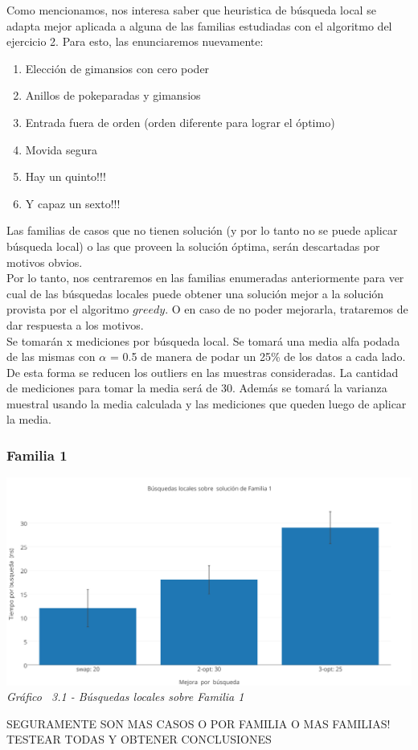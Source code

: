 Como mencionamos, nos interesa saber que heuristica de búsqueda local se adapta mejor aplicada a alguna de las familias estudiadas con el algoritmo del ejercicio 2. Para esto, las enunciaremos nuevamente:

\begin{enumerate}
\item Elección de gimansios con cero poder 
\item Anillos de pokeparadas y gimansios
\item Entrada fuera de orden (orden diferente para lograr el óptimo)
\item Movida segura
\item Hay un quinto!!!
\item Y capaz un sexto!!!
\end{enumerate}

Las familias de casos que no tienen solución (y por lo tanto no se puede aplicar búsqueda local) o las que proveen la solución óptima, serán descartadas por motivos obvios.\\
Por lo tanto, nos centraremos en las familias enumeradas anteriormente para ver cual de las búsquedas locales puede obtener una solución mejor a la solución provista por el algoritmo $greedy$. O en caso de no poder mejorarla, trataremos de dar respuesta a los motivos.\\

Se tomarán x mediciones por búsqueda local. Se tomará una media alfa podada de las mismas con $\alpha$ = 0.5 de manera de podar un 25\% de los datos a cada lado. De esta forma se reducen los outliers en las muestras consideradas. 
La cantidad de mediciones para tomar la media será de 30. Además se tomará la varianza muestral usando la media calculada y las mediciones que queden luego de aplicar la media.\\

\subsubsection*{Familia 1}

\vspace*{0.3cm} \vspace*{0.3cm}
  \begin{center}
 \includegraphics[scale=0.5]{./EJ3/local_search_familia.png}
 {            \textit{Gráfico \ 3.1 - Búsquedas locales sobre Familia 1}}
  \end{center}
  \vspace*{0.3cm}
  
SEGURAMENTE SON MAS CASOS O POR FAMILIA O MAS FAMILIAS! TESTEAR TODAS Y OBTENER CONCLUSIONES

